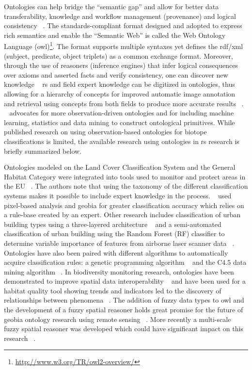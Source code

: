 \documentclass[authoryear,preprint,12pt,number]{elsarticle}
\begin{document}
Ontologies can help bridge the ``semantic gap'' and allow for better data 
transferability, knowledge and workflow management (provenance) and logical 
consistency ~\citep{Janowicz2012}.  The standards-compliant format designed and 
adopted to express rich semantics and enable the ``Semantic Web'' is called the 
Web Ontology Language 
(\gls{owl})\footnote{\url{http://www.w3.org/TR/owl2-overview/}}. The format 
supports multiple syntaxes yet defines the \gls{rdf}/\gls{xml} (subject, 
predicate, object triplets) as a common exchange format.  Moreover, through the 
use of reasoners (inference engines) that infer logical consequences over 
axioms and asserted facts and verify consistency, one can discover new 
knowledge ~\citep{Arvor2013, Andres2013a} \gls{rs} and field expert knowledge 
can be digitized in ontologies, thus allowing for a hierarchy of concepts for 
improved automatic image annotation and retrieval using concepts from both 
fields to produce more accurate results ~\citep{Srikanth2005}. 
~\cite{Janowicz2012} advocates for more observation-driven ontologies and for 
including machine learning, statistics and data mining to construct ontological 
primitives. While published research on using observation-based ontologies for 
biotope classifications is limited, the available research using ontologies in 
\gls{rs} research is briefly summarized below.

Ontologies modeled on the Land Cover Classification System and the General 
Habitat Category were integrated into tools used to monitor and protect areas 
in the EU ~\citep{Arvor2013}. The authors note that using the taxonomy of the 
different classification systems makes it possible to include expert knowledge 
in the process. ~\cite{Lucas2015} used pixel-based analysis and \gls{geobia} 
for greater classification accuracy which relies on a rule-base created by an 
expert. Other research includes classification of urban building types using a 
three-layered architecture ~\citep{diSciascio2013} and a semi-automated 
classification of urban building using the Random Forest (RF) classifier to 
determine variable importance of features from airborne laser scanner data 
~\citep{Belgiu2014}. Ontologies have also been paired with different algorithms 
to automatically acquire classification rules: a genetic programming algorithm 
~\citep{Forestier2012470} and the C4.5 data mining algorithm 
~\citep{Sheeren2006ML}. In biodiversity monitoring research, ontologies have 
been demonstrated to improve spatial data interoperability 
~\citep{Nieland2015a, Nieland2015b} and have been used for a habitat quality 
tool showing trends and indicators led to the discovery of relationships 
between phenomena ~\citep{Perez-Luque2015}. The addition of fuzzy data types to 
\gls{owl} and the development of a fuzzy spatial reasoner holds great promise 
for the future of \gls{geobia} ontology research using remote sensing 
~\citep{Belgiu2013, Bobillo2015}. More recently a multi-scale fuzzy spatial 
reasoner was developed which could have significant impact on this research 
~\citep{Argyridis2015}.
\end{document}
